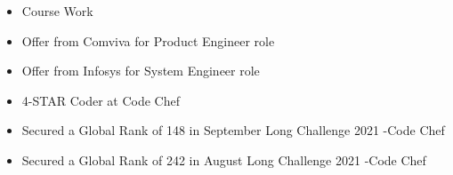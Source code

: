 
\smallskip
\smallskip

\begin{itemize}
\item \textcolor{emphasis}{Course Work}
\end{itemize}
\smallskip
{}









\begin{itemize}
    \item Offer from Comviva for Product Engineer role
    \item Offer from Infosys for System Engineer role
    \item 4-STAR Coder at Code Chef
    \item Secured a Global Rank of 148 in September Long Challenge 2021 -Code Chef
    \item Secured a Global Rank of 242 in August Long Challenge 2021 -Code Chef
   
    
    
\end{itemize}








\clearpage


\nocite{*}












